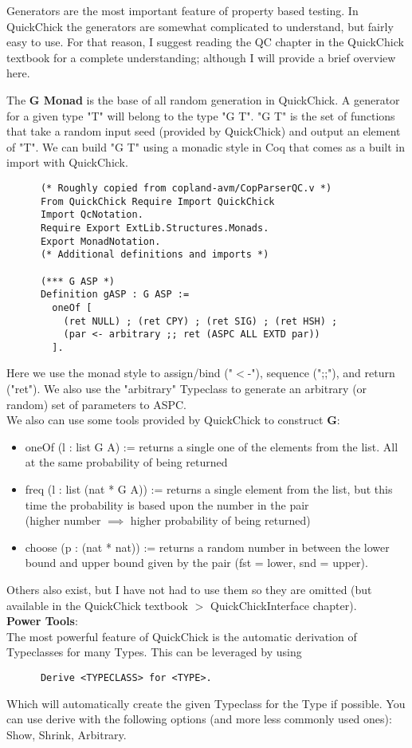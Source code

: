 \documentclass{article}
\begin{document}
    Generators are the most important feature of property based testing. In QuickChick the generators are somewhat complicated to understand, but fairly easy to use. For that reason, I suggest reading the QC chapter in the QuickChick textbook for a complete understanding; although I will provide a brief overview here.

    The \textbf{G Monad} is the base of all random generation in QuickChick. A generator for a given type "T" will belong to the type "G T". "G T" is the set of functions that take a random input seed (provided by QuickChick) and output an element of "T". We can build "G T" using a monadic style in Coq that comes as a built in import with QuickChick.
    \begin{verbatim}
      (* Roughly copied from copland-avm/CopParserQC.v *)
      From QuickChick Require Import QuickChick
      Import QcNotation. 
      Require Export ExtLib.Structures.Monads.
      Export MonadNotation.
      (* Additional definitions and imports *)

      (*** G ASP *)
      Definition gASP : G ASP :=
        oneOf [
          (ret NULL) ; (ret CPY) ; (ret SIG) ; (ret HSH) ;
          (par <- arbitrary ;; ret (ASPC ALL EXTD par))
        ].
    \end{verbatim}
    Here we use the monad style to assign/bind ("$<$-"), sequence (";;"), and return ("ret").
    We also use the "arbitrary" Typeclass to generate an arbitrary (or random) set of parameters to ASPC. \\
    We also can use some tools provided by QuickChick to construct \textbf{G}:
    \begin{itemize}
      \item oneOf (l : list G A) := returns a single one of the elements from the list. All at the same probability of being returned
      \item freq (l : list (nat * G A)) := returns a single element from the list, but this time the probability is based upon the number in the pair \\
      (higher number $\implies$ higher probability of being returned)
      \item choose (p : (nat * nat)) := returns a random number in between the lower bound and upper bound given by the pair (fst = lower, snd = upper).
    \end{itemize}
    Others also exist, but I have not had to use them so they are omitted (but available in the QuickChick textbook $>$ QuickChickInterface chapter). \\
    \textbf{Power Tools}: \\
    The most powerful feature of QuickChick is the automatic derivation of Typeclasses for many Types.
    This can be leveraged by using 
    \begin{verbatim}
      Derive <TYPECLASS> for <TYPE>.
    \end{verbatim}
    Which will automatically create the given Typeclass for the Type if possible. 
    You can use derive with the following options (and more less commonly used ones): Show, Shrink, Arbitrary.
\end{document}
